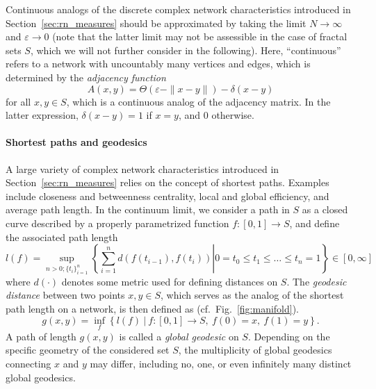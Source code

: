 Continuous analogs of the discrete complex network characteristics introduced in Section~\ref{sec:rn_measures} should be approximated by taking the limit $N\to\infty$ and $\varepsilon\to 0$ (note that the latter limit may not be assessible in the case of fractal sets $S$, which we will not further consider in the following). Here, ``continuous'' refers to a network with uncountably many vertices and edges, which is determined by the \emph{adjacency function}
\begin{equation}
A(x,y)=\Theta(\varepsilon-\|x-y\|)-\delta(x-y)
\end{equation}
\noindent
for all $x,y\in S$, which is a continuous analog of the adjacency matrix. In the latter expression, $\delta(x-y)=1$ if $x=y$, and $0$ otherwise.


\paragraph{Shortest paths and geodesics}

A large variety of complex network characteristics introduced in Section~\ref{sec:rn_measures} relies on the concept of shortest paths. Examples include closeness and betweenness centrality, local and global efficiency, and average path length. In the continuum limit, we consider a path in $S$ as a closed curve described by a properly parametrized function $f:[0,1]\to S$, and define the associated path length 
\begin{equation}
l(f) = \sup_{n>0; \{t_i\}_{i=1}^n} \left.\left\{ \sum_{i=1}^n d(f(t_{i-1}),f(t_i)) \right| 0=t_0\leq t_1\leq\dots\leq t_n=1 \right\} \in[0,\infty] 
\end{equation}
\noindent
where $d(\cdot)$ denotes some metric used for defining distances on $S$. The \textit{geodesic distance} between two points $x,y\in S$, which serves as the analog of the shortest path length on a network, is then defined as (cf.~Fig.~\ref{fig:manifold}).
\begin{equation}
g(x,y) = \inf_f \left\{ l(f)\ |\ f:[0,1]\to S,\ f(0)=x,\ f(1)=y \right\}.
\end{equation}
\noindent
A path of length $g(x,y)$ is called a \emph{global geodesic} on $S$. Depending on the specific geometry of the considered set $S$, the multiplicity of global geodesics connecting $x$ and $y$ may differ, including no, one, or even infinitely many distinct global geodesics.

